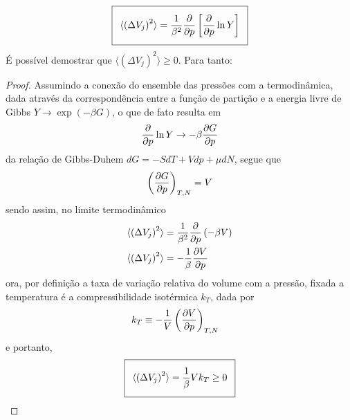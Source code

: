 \begin{prob}
\begin{sol}
\begin{enumerate}[label=\alph *)]
\begin{align}
\begin{split}
        \end{split}
      \end{align}
      \begin{align}
        \addtolength{\fboxsep}{5pt}
        \boxed{
          \begin{gathered}
            \langle \left(\Delta V_j\right)^2\rangle=\frac{1}{\beta^2}\parder{}{p}\left[\parder{}{p}\ln Y\right]
          \end{gathered}
        }
      \end{align}
      É possível demostrar que $\langle \left(\Delta V_j\right)^2\rangle\geq 0$. Para tanto:
      \begin{proof}
        Assumindo a conexão do ensemble das pressões com a termodinâmica, dada através da correspondência entre a função de partição e a energia livre de Gibbs $Y\to\exp\left(-\beta G\right)$, o que de fato resulta em
        \begin{align}
          \frac{\partial {}}{\partial {p}}\ln Y\to -\beta\frac{\partial {G}}{\partial {p}}
        \end{align}
        da relação de Gibbs-Duhem $dG=-SdT+Vdp+\mu dN$, segue que
        \begin{align}
          \left(\frac{\partial {G}}{\partial {p}}\right)_{T,N}=V
        \end{align}
        sendo assim, no limite termodinâmico
        \begin{align}
          \begin{split}
            \langle \left(\Delta V_j\right)^2\rangle&=\frac{1}{\beta^2}\frac{\partial {}}{\partial {p}}\left(-\beta V\right)\\
            \langle \left(\Delta V_j\right)^2\rangle&=-\frac{1}{\beta}\frac{\partial {V}}{\partial {p}}
          \end{split}
        \end{align}
        ora, por definição a taxa de variação relativa do volume com a pressão, fixada a temperatura é a compressibilidade isotérmica $k_T$, dada por
        \begin{align}
          k_T&\equiv -\frac{1}{V}\left(\frac{\partial {V}}{\partial {p}}\right)_{T,N}
        \end{align}
        e portanto,
        \begin{align}
          \addtolength{\fboxsep}{5pt}
          \boxed{
            \begin{gathered}
              \langle \left(\Delta V_j\right)^2\rangle=\frac{1}{\beta}Vk_T\geq 0
            \end{gathered}
          }
        \end{align}
      \end{proof}


\end{enumerate}
\end{sol}
\end{prob}
